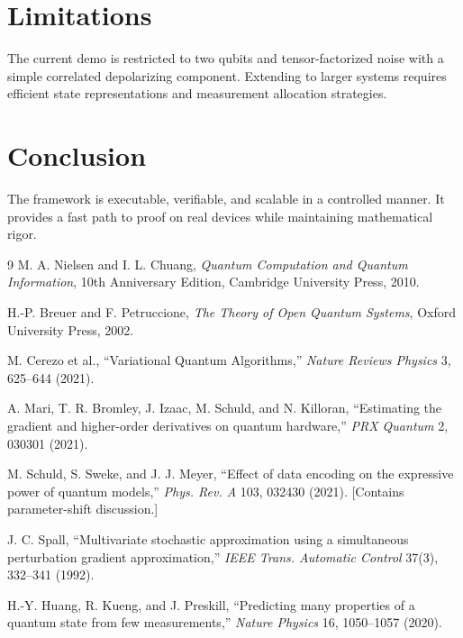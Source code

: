 \documentclass[11pt]{article}
\begin{document}
\section{Limitations}
The current demo is restricted to two qubits and tensor-factorized noise with a simple correlated depolarizing component. Extending to larger systems requires efficient state representations and measurement allocation strategies.

\section{Conclusion}
The framework is executable, verifiable, and scalable in a controlled manner. It provides a fast path to proof on real devices while maintaining mathematical rigor.

\begin{thebibliography}{9}
M. A. Nielsen and I. L. Chuang, \emph{Quantum Computation and Quantum Information}, 10th Anniversary Edition, Cambridge University Press, 2010.

H.-P. Breuer and F. Petruccione, \emph{The Theory of Open Quantum Systems}, Oxford University Press, 2002.

M. Cerezo et al., ``Variational Quantum Algorithms,'' \emph{Nature Reviews Physics} 3, 625–644 (2021).

A. Mari, T. R. Bromley, J. Izaac, M. Schuld, and N. Killoran, ``Estimating the gradient and higher-order derivatives on quantum hardware,'' \emph{PRX Quantum} 2, 030301 (2021).

M. Schuld, S. Sweke, and J. J. Meyer, ``Effect of data encoding on the expressive power of quantum models,'' \emph{Phys. Rev. A} 103, 032430 (2021). [Contains parameter-shift discussion.]

J. C. Spall, ``Multivariate stochastic approximation using a simultaneous perturbation gradient approximation,'' \emph{IEEE Trans. Automatic Control} 37(3), 332–341 (1992).

H.-Y. Huang, R. Kueng, and J. Preskill, ``Predicting many properties of a quantum state from few measurements,'' \emph{Nature Physics} 16, 1050–1057 (2020).
\end{thebibliography}
\end{document}
